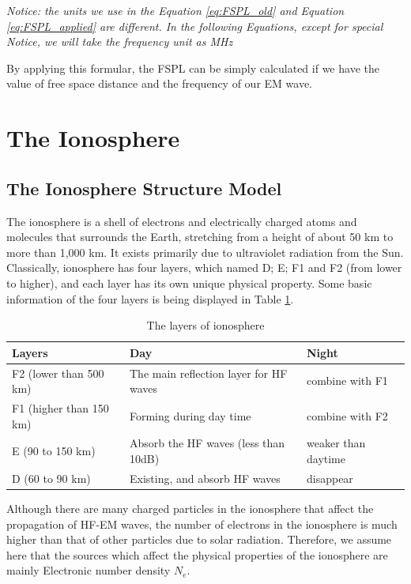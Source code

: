\documentclass{mcmthesis}
\begin{document}
      \emph{Notice: the units we use in the Equation \ref{eq:FSPL_old} and Equation \ref{eq:FSPL_applied} are different. In the following Equations, except for special Notice, we will take the frequency unit as MHz}

      By applying this formular, the FSPL can be simply calculated if we have the value of free space distance and the frequency of our EM wave.

\section{The Ionosphere}

  \subsection{The Ionosphere Structure Model}
    The ionosphere is a shell of electrons and electrically charged atoms and molecules that surrounds the Earth, stretching from a height of about 50 km to more than 1,000 km. It exists primarily due to ultraviolet radiation from the Sun. Classically, ionosphere has four layers, which named D; E; F1 and F2 (from lower to higher), and each layer has its own unique physical property.\cite{davies1990ionospheric} Some basic information of the four layers is being displayed in Table \ref{tab: the ionosphere layers}.

        \begin{table}
          \centering
            \begin{tabular}{|l|l|l|}
            \hline
            Layers                  &Day & Night      \\ \hline
            F2 (lower than 500 km)  & The main reflection layer for HF waves & combine with F1          \\ \hline
            F1 (higher than 150 km) & Forming during day time       & combine with F2    \\ \hline
            E  (90 to 150 km)       & Absorb the HF waves (less than 10dB) & weaker than daytime          \\ \hline
            D  (60 to 90 km)        & Existing, and absorb HF waves &disappear  \\ \hline
            \end{tabular}
            \caption{The layers of ionosphere}
            \label{tab: the ionosphere layers}
        \end{table}

    Although there are many charged particles in the ionosphere that affect the propagation of HF-EM waves, the number of electrons in the ionosphere is much higher than that of other particles due to solar radiation. Therefore, we assume here that the sources which affect the physical properties of the ionosphere are mainly Electronic number density $N_{e}$.
\end{document}
